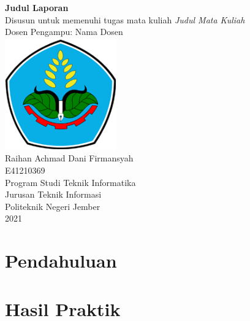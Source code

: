 \documentclass[a4paper]{article}
\begin{document}
\begin{center}


  {\huge \bfseries Judul Laporan}
  \\[0.7em]
  Disusun untuk memenuhi tugas mata kuliah {\it Judul Mata Kuliah}
  \\[0.3em]
  Dosen Pengampu: Nama Dosen
  \\[10em]

  \includegraphics[width=13em]{figs/poliyeay.png}
  \\[3em]
{\normalfont Raihan Achmad Dani Firmansyah}
  \\[0.7em]

{\normalfont E41210369}
  \\[15em]
{\Large Program Studi Teknik Informatika}
  \\[0.7em]
{\Large Jurusan Teknik Informasi}
  \\[0.7em]
{\Large Politeknik Negeri Jember}
  \\[0.7em]
{\Large 2021}

\end{center}

\newpage
\begin{center}
\tableofcontents
\end{center}

\newpage
\section{Pendahuluan}

\newpage
\section{Hasil Praktik}
\end{document}

